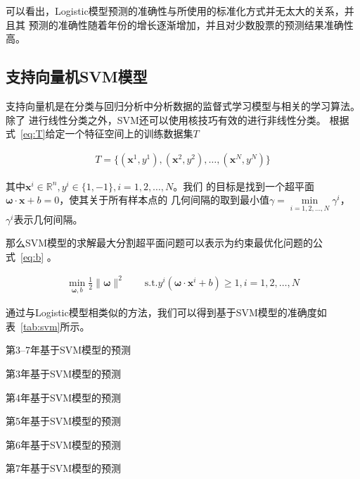 \documentclass[../main]{subfiles}
\begin{document}
可以看出，Logistic模型预测的准确性与所使用的标准化方式并无太大的关系，并且其
预测的准确性随着年份的增长逐渐增加，并且对少数股票的预测结果准确性高。

\subsection{支持向量机SVM模型}%
\label{sub:svm}

支持向量机是在分类与回归分析中分析数据的监督式学习模型与相关的学习算法。除了
进行线性分类之外，SVM还可以使用核技巧有效的进行非线性分类。
根据式~\ref{eq:T}给定一个特征空间上的训练数据集$T$

\begin{align}
  \label{eq:T}
  T = \{(\bm{x}^1, y^1), (\bm{x}^2, y^2), \ldots, (\bm{x}^N, y^N)\}
\end{align}

其中$\bm{x}^i \in \mathbb{R}^n, y^i \in \{1, -1\}, i = 1, 2, \ldots, N$。我们
的目标是找到一个超平面$\bm{\omega}\cdot\bm{x} + b = 0$，使其关于所有样本点的
几何间隔的取到最小值$\gamma = \min\limits_{i = 1, 2, \ldots, N}\gamma^i$，
$\gamma^i$表示几何间隔。

那么SVM模型的求解最大分割超平面问题可以表示为约束最优化问题的公式~\ref{eq:b}
。

\begin{align}
  \label{eq:b}
  \min_{\bm{\omega}, b}
  \frac{1}{2}\lVert\bm{\omega}\rVert^2\qquad\mathrm{s.t.}
  y^i(\bm{\omega}\cdot\bm{x}^i + b)\geqslant 1, i = 1, 2, \dots, N
\end{align}

通过与Logistic模型相类似的方法，我们可以得到基于SVM模型的准确度如
表~\ref{tab:svm}所示。

\begin{table}[htpb]
  \centering
  \caption{第3--7年基于SVM模型的预测}%
  \label{tab:svm}
  \setlength\tabcolsep{2pt}
  \begin{subtable}[htbp]{0.45\linewidth}
    \centering
    \caption{第3年基于SVM模型的预测}%
    \label{tab:svm3}
  \end{subtable}
  \qquad
  \begin{subtable}[htbp]{0.45\linewidth}
    \centering
    \caption{第4年基于SVM模型的预测}%
    \label{tab:svm4}
  \end{subtable}

  \begin{subtable}[htbp]{0.45\linewidth}
    \centering
    \caption{第5年基于SVM模型的预测}%
    \label{tab:svm5}
  \end{subtable}
  \qquad
  \begin{subtable}[htbp]{0.45\linewidth}
    \centering
    \caption{第6年基于SVM模型的预测}%
    \label{tab:svm6}
  \end{subtable}

  \begin{subtable}[htbp]{0.45\linewidth}
    \centering
    \caption{第7年基于SVM模型的预测}%
    \label{tab:svm7}
  \end{subtable}
\end{table}
\end{document}
